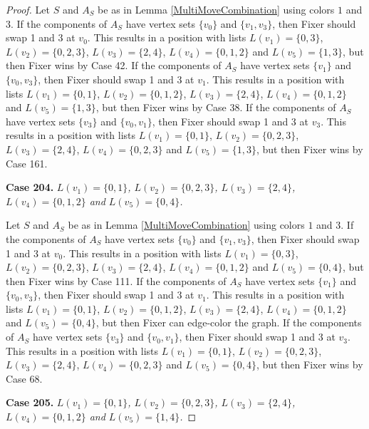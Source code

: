 \documentclass[12pt]{amsart}
\theoremstyle{plain}
\theoremstyle{definition}
\theoremstyle{remark}
\begin{document}
\begin{proof}
Let $S$ and $A_S$ be as in Lemma \ref{MultiMoveCombination} using colors $1$ and $3$. If the components of $A_S$ have vertex sets $\{v_0\}$ and $\{v_1, v_3\}$, then Fixer should swap 1 and 3 at $v_0$. This results in a position with lists $L(v_1) = \{0, 3\}$, $L(v_2) = \{0, 2, 3\}$, $L(v_3) = \{2, 4\}$, $L(v_4) = \{0, 1, 2\}$ and $L(v_5) = \{1, 3\}$, but then Fixer wins by Case 42.
If the components of $A_S$ have vertex sets $\{v_1\}$ and $\{v_0, v_3\}$, then Fixer should swap 1 and 3 at $v_1$. This results in a position with lists $L(v_1) = \{0, 1\}$, $L(v_2) = \{0, 1, 2\}$, $L(v_3) = \{2, 4\}$, $L(v_4) = \{0, 1, 2\}$ and $L(v_5) = \{1, 3\}$, but then Fixer wins by Case 38.
If the components of $A_S$ have vertex sets $\{v_3\}$ and $\{v_0, v_1\}$, then Fixer should swap 1 and 3 at $v_3$. This results in a position with lists $L(v_1) = \{0, 1\}$, $L(v_2) = \{0, 2, 3\}$, $L(v_3) = \{2, 4\}$, $L(v_4) = \{0, 2, 3\}$ and $L(v_5) = \{1, 3\}$, but then Fixer wins by Case 161.

\noindent\textbf{Case 204.  }\textit{$L(v_1) = \{0, 1\}$, $L(v_2) = \{0, 2, 3\}$, $L(v_3) = \{2, 4\}$, $L(v_4) = \{0, 1, 2\}$ and $L(v_5) = \{0, 4\}$.}

Let $S$ and $A_S$ be as in Lemma \ref{MultiMoveCombination} using colors $1$ and $3$. If the components of $A_S$ have vertex sets $\{v_0\}$ and $\{v_1, v_3\}$, then Fixer should swap 1 and 3 at $v_0$. This results in a position with lists $L(v_1) = \{0, 3\}$, $L(v_2) = \{0, 2, 3\}$, $L(v_3) = \{2, 4\}$, $L(v_4) = \{0, 1, 2\}$ and $L(v_5) = \{0, 4\}$, but then Fixer wins by Case 111.
If the components of $A_S$ have vertex sets $\{v_1\}$ and $\{v_0, v_3\}$, then Fixer should swap 1 and 3 at $v_1$. This results in a position with lists $L(v_1) = \{0, 1\}$, $L(v_2) = \{0, 1, 2\}$, $L(v_3) = \{2, 4\}$, $L(v_4) = \{0, 1, 2\}$ and $L(v_5) = \{0, 4\}$, but then Fixer can edge-color the graph.
If the components of $A_S$ have vertex sets $\{v_3\}$ and $\{v_0, v_1\}$, then Fixer should swap 1 and 3 at $v_3$. This results in a position with lists $L(v_1) = \{0, 1\}$, $L(v_2) = \{0, 2, 3\}$, $L(v_3) = \{2, 4\}$, $L(v_4) = \{0, 2, 3\}$ and $L(v_5) = \{0, 4\}$, but then Fixer wins by Case 68.

\noindent\textbf{Case 205.  }\textit{$L(v_1) = \{0, 1\}$, $L(v_2) = \{0, 2, 3\}$, $L(v_3) = \{2, 4\}$, $L(v_4) = \{0, 1, 2\}$ and $L(v_5) = \{1, 4\}$.}


\end{proof}
\end{document}
